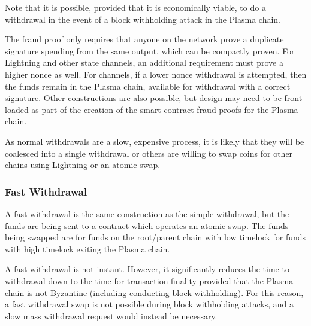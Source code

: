 \documentclass[letterpaper, 11pt]{article}
\begin{document}

Note that it is possible, provided that it is economically viable, to do a
withdrawal in the event of a block withholding attack in the Plasma chain.

The fraud proof only requires that anyone on the network prove a duplicate
signature spending from the same output, which can be compactly proven. For
Lightning and other state channels, an additional requirement must prove a
higher nonce as well. For channels, if a lower nonce withdrawal is attempted,
then the funds remain in the Plasma chain, available for withdrawal with a
correct signature. Other constructions are also possible, but design may need to
be front-loaded as part of the creation of the smart contract fraud proofs for
the Plasma chain.

As normal withdrawals are a slow, expensive process, it is likely that they will
be coalesced into a single withdrawal or others are willing to swap coins for
other chains using Lightning or an atomic swap\cite{tiernolan}.

\subsubsection{Fast Withdrawal}

A fast withdrawal is the same construction as the simple withdrawal, but the
funds are being sent to a contract which operates an atomic swap. The funds
being swapped are for funds on the root/parent chain with low timelock for funds
with high timelock exiting the Plasma chain.

A fast withdrawal is not instant. However, it significantly reduces the time to
withdrawal down to the time for transaction finality provided that the Plasma
chain is not Byzantine (including conducting block withholding). For this
reason, a fast withdrawal swap is not possible during block withholding attacks,
and a slow mass withdrawal request would instead be necessary.
\end{document}
